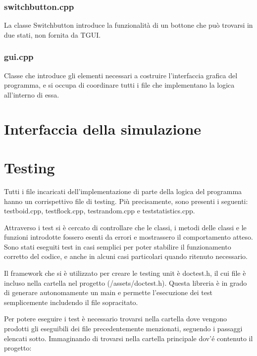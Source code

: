 \documentclass[10pt,a4paper]{article}
\begin{document}
\subsubsection{switchbutton.cpp}

La classe Switchbutton introduce la funzionalità di un bottone che può trovarsi in due stati, non fornita da TGUI.

\subsubsection{gui.cpp}

Classe che introduce gli elementi necessari a costruire l'interfaccia grafica del programma, e si occupa di coordinare tutti i file che implementano la logica all'interno di essa. 

\newpage

\section{Interfaccia della simulazione}
\newpage

\section{Testing}

Tutti i file incaricati dell'implementazione di parte della logica del programma hanno un corrispettivo file di testing. Più precisamente, sono presenti i seguenti: testboid.cpp, testflock.cpp, testrandom.cpp e teststatistics.cpp. 

Attraverso i test si è cercato di controllare che le classi, i metodi delle classi e le funzioni introdotte fossero esenti da errori e mostrassero il comportamento atteso. Sono stati eseguiti test in casi semplici per poter stabilire il funzionamento corretto del codice, e anche in alcuni casi particolari quando ritenuto necessario.

Il framework che si è utilizzato per creare le testing unit è doctest.h, il cui file è incluso nella cartella nel progetto (/assets/doctest.h). Questa libreria è in grado di generare autonomamente un main e permette l'esecuzione dei test semplicemente includendo il file sopracitato.

Per potere eseguire i test è necessario trovarsi nella cartella dove vengono prodotti gli eseguibili dei file precedentemente menzionati, seguendo i passaggi elencati sotto. Immaginando di trovarsi nella cartella principale dov'é contenuto il progetto:
\end{document}
